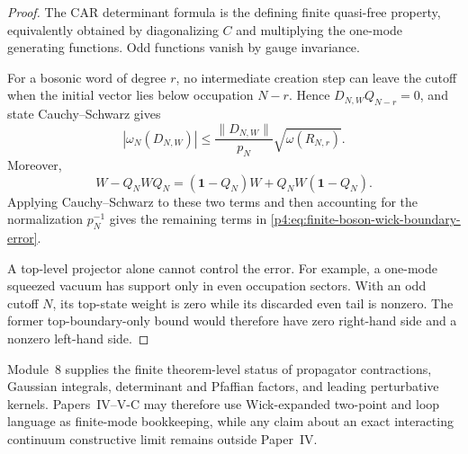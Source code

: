 \documentclass[12pt,a4paper]{article}
\begin{document}
\begin{proof}
The CAR determinant formula is the defining finite quasi-free property,
equivalently obtained by diagonalizing \(C\) and multiplying the one-mode
generating functions.  Odd functions vanish by gauge invariance.

For a bosonic word of degree \(r\), no intermediate creation step can leave
the cutoff when the initial vector lies below occupation \(N-r\).  Hence
\(D_{N,W}Q_{N-r}=0\), and state Cauchy--Schwarz gives
\[
|\omega_N(D_{N,W})|
\le
\frac{\|D_{N,W}\|}{p_N}\sqrt{\omega(R_{N,r})}.
\]
Moreover,
\[
W-Q_NWQ_N=(\mathbf1-Q_N)W+Q_NW(\mathbf1-Q_N).
\]
Applying Cauchy--Schwarz to these two terms and then accounting for the
normalization \(p_N^{-1}\) gives the remaining terms in
\eqref{p4:eq:finite-boson-wick-boundary-error}.

A top-level projector alone cannot control the error.  For example, a
one-mode squeezed vacuum has support only in even occupation sectors.  With
an odd cutoff \(N\), its top-state weight is zero while its discarded even
tail is nonzero.  The former top-boundary-only bound would therefore have
zero right-hand side and a nonzero left-hand side.
\end{proof}

\begin{remark}
\label{p4:rem:finite-wick-downstream-support}
\leavevmode\par\noindent
Module~8 supplies the finite theorem-level status of propagator contractions,
Gaussian integrals, determinant and Pfaffian factors, and leading perturbative
kernels.  Papers~IV--V-C may therefore use Wick-expanded two-point and loop
language as finite-mode bookkeeping, while any claim about an exact interacting
continuum constructive limit remains outside Paper~IV.
\end{remark}



\end{document}
